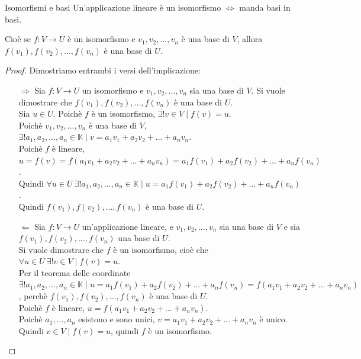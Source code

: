 \documentclass[a4paper]{article}
\theoremstyle{definition}
\begin{document}
\begin{teo}{Isomorfismi e basi}{}
	Un'applicazione lineare è un isomorfismo $\Leftrightarrow$ manda basi in basi.
	
	Cioè se $f: V \rightarrow U$ è un isomorfismo e $v_1, v_2, ..., v_n$ è una base di $V$, allora $f(v_1), f(v_2), ..., f(v_n)$ è una base di $U$.
\end{teo}
\begin{proof}
	Dimostriamo entrambi i versi dell'implicazione:
	\begin{itemize}
		\item[$\Rightarrow$] Sia $f: V \rightarrow U$ un isomorfismo e $v_1, v_2, ..., v_n$ sia una base di $V$. Si vuole dimostrare che $f(v_1), f(v_2), ..., f(v_n)$ è una base di $U$. \\
		      Sia $u \in U$. Poichè $f$ è un isomorfismo, $\exists! v \in V \mid f(v) = u$. \\
		      Poichè $v_1, v_2, ..., v_n$ è una base di $V$, $\exists! a_1, a_2, ..., a_n \in \mathbb{K} \mid v = a_1v_1 + a_2v_2 + ... + a_nv_n$. \\
		      Poichè $f$ è lineare, $u = f(v) = f(a_1v_1 + a_2v_2 + ... + a_nv_n) = a_1f(v_1) + a_2f(v_2) + ... + a_nf(v_n)$. \\
			  Quindi $\forall u \in U \ \exists! a_1, a_2, ..., a_n \in \mathbb{K} \mid u = a_1f(v_1) + a_2f(v_2) + ... + a_nf(v_n)$. \\
			  Quindi $f(v_1), f(v_2), ..., f(v_n)$ è una base di $U$.
		\item[$\Leftarrow$] Sia $f: V \rightarrow U$ un'applicazione lineare, e $v_1, v_2, ..., v_n$ sia una base di $V$ e sia $f(v_1), f(v_2), ..., f(v_n)$ una base di $U$. \\
		      Si vuole dimostrare che $f$ è un isomorfismo, cioè che $\forall u \in U \ \exists! v \in V \mid f(v) = u$. \\
		      Per il teorema delle coordinate $\exists! a_1, a_2, ..., a_n \in \mathbb{K} \mid u = a_1f(v_1) + a_2f(v_2) + ... + a_nf(v_n) = f(a_1v_1 + a_2v_2 + ... + a_nv_n)$, perchè $f(v_1), f(v_2), ..., f(v_n)$ è una base di $U$. \\
		      Poichè $f$ è lineare, $u = f(a_1v_1 + a_2v_2 + ... + a_nv_n)$. \\
			  Poichè $a_1, ..., a_n$ esistono e sono unici, $v = a_1v_1 + a_2v_2 + ... + a_nv_n$ è unico. \\
			  Quindi $v \in V \mid f(v) = u$, quindi $f$ è un isomorfismo.
	\end{itemize}
\end{proof}
\end{document}
